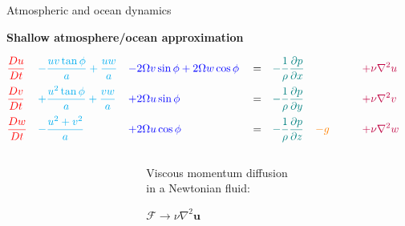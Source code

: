 \documentclass[aspectratio=169,xcolor=dvipsnames]{beamer}
\begin{document}
\begin{frame}[t]{Atmospheric and ocean dynamics}

\vspace{-1.0em}

\begin{center}
\textbf{{\large
Shallow atmosphere/ocean approximation
}}
\end{center}

\begin{align*}
    &\textcolor{red}{    \frac{Du}{Dt}   }&
    &\textcolor{cyan}{   - \frac{uv \tan\phi}{a} + \frac{uw}{a}  }& 
    & \textcolor{blue}{   - 2\Omega v \sin\phi + 2\Omega w \cos\phi   }&
    & = &
    &\textcolor{teal}{   -\frac{1}{\rho}\frac{\partial p}{\partial x}  }&
    &&
    & \textcolor{purple}{\quad + \nu \nabla^2 u }&
    \\
    &\textcolor{red}{    \frac{Dv}{Dt}   } &
    &\textcolor{cyan}{   + \frac{u^2 \tan\phi}{a} + \frac{vw}{a}     }&
    & \textcolor{blue}{   + 2\Omega u \sin\phi    }&
    & = &
    &\textcolor{teal}{   -\frac{1}{\rho}\frac{\partial p}{\partial y}  }&
    &&
    & \textcolor{purple}{\quad + \nu \nabla^2 v }&
    \\
    &\textcolor{red}{    \frac{Dw}{Dt}   } &
    &\textcolor{cyan}{   - \frac{u^2 + v^2}{a}   }&
    & \textcolor{blue}{   + 2\Omega u \cos\phi    }&
    & = &
    &\textcolor{teal}{   -\frac{1}{\rho}\frac{\partial p}{\partial z} }&
    & \textcolor{orange}{- g \quad}&
    & \textcolor{purple}{\quad + \nu \nabla^2 w }&
\end{align*}

\begin{columns}
    \begin{column}{0.7\textwidth}
    \end{column}
    \begin{column}{0.3\textwidth}
        \begin{block}{}
            {\footnotesize
            Viscous momentum diffusion \\
            in a Newtonian fluid:
            }
            \begin{center}
            {\small
            $\mathcal{F}\rightarrow\nu\nabla^2\mathbf{u} $
            }
            \end{center}
        \end{block}

    \end{column}
\end{columns}

\end{frame}
\end{document}
